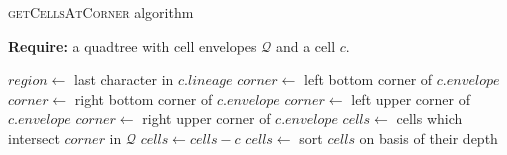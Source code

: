 \documentclass{article}
\begin{document}
    \begin{algorithm} \caption{\textsc{getCellsAtCorner} algorithm}
        \textbf{Require:} a quadtree with cell envelopes $\mathcal Q$ and a cell $c$.
        \begin{algorithmic}[1]
            \State $region \gets $ last character in $c.lineage$
                    \State $corner \gets$ left bottom corner of $c.envelope$
                \EndCase
                    \State $corner \gets$ right bottom corner of $c.envelope$
                \EndCase
                    \State $corner \gets$ left upper corner of $c.envelope$
                \EndCase
                    \State $corner \gets$ right upper corner of $c.envelope$
                \EndCase
            \EndSwitch
            \State $cells \gets$ cells which intersect $corner$ in $\mathcal Q$
            \State $cells \gets cells - c$ 
            \State $cells \gets$ sort $cells$ on basis of their depth 
            \State {}
        \EndFunction
        \end{algorithmic}
    \end{algorithm}
\end{document}
